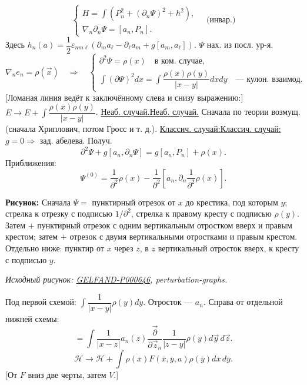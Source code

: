 \documentclass[11pt]{article}
\theoremstyle{definition}
\theoremstyle{remark}
\newcommand{\SourceFigure}[3]{%
  \par\begingroup\color{blue!60!black}\textbf{\hyperref[#1:source-page]{Source figure #1/#2}:} #3%
  \par\textit{Consult the authoritative scan at this locator.}\endgroup\par%
}
\renewcommand{\SourceFigure}[3]{%
  \par\begingroup\color{blue!55!black}\textbf{Рисунок:} #3%
  \par{\small\textit{Исходный рисунок: \hyperref[#1:source-page]{#1}, #2.}}%
  \endgroup\par%
}
\let\DiplomaticMathUnderline\underline
\renewcommand{\underline}[1]{\ifmmode\DiplomaticMathUnderline{#1}\else\uline{#1}\fi}
\begin{document}
\begin{equation*}
\begin{cases}
H=\int(P_n^2+(\partial_n\Psi)^2+h^2),\\
\nabla_n\partial_n\Psi=[a_n,P_n].
\end{cases}
\quad\text{(инвар.)}
\end{equation*}
Здесь $h_n(a)=\dfrac12\varepsilon_{nm\ell}(\partial_m a_\ell-\partial_\ell a_m+g[a_m,a_\ell])$.
$\Psi$ нах. из посл. ур-я.
\begin{equation*}
\nabla_n e_n=\rho(\vec x)\quad\Rightarrow\quad
\begin{cases}
\partial^2\Psi=\rho(x)\quad\text{в ком. случае},\\
\int(\partial\Psi)^2dx=\int\dfrac{\rho(x)\rho(y)}{|x-y|}dxdy\quad\text{--- кулон. взаимод.}
\end{cases}
\end{equation*}
[Ломаная линия ведёт к заключённому слева и снизу выражению:]
$E\to E+\int\dfrac{\rho(x)\rho(y)}{|x-y|}$.
\underline{Неаб. случай.} Сначала по теории возмущ. (сначала Хриплович, потом Гросс и т. д.).
\underline{Классич. случай:} $g=0\Rightarrow$ зад. абелева.
Получ.
\begin{equation*}
\partial^2\Psi+g[a_n,\partial_n\Psi]=g[a_n,P_n]+\rho(x).
\end{equation*}
Приближения:
\begin{equation*}
\Psi^{(0)}=\frac1{\partial^2}\rho(x)-\frac1{\partial^2}
\left[a_n,\partial_n\frac1{\partial^2}\rho(x)\right].
\end{equation*}
\SourceFigure{GELFAND-P000646}{perturbation-graphs}{Сначала $\Psi=$ пунктирный отрезок от $x$ до крестика, под которым $y$; стрелка к отрезку с подписью $1/\partial^2$, стрелка к правому кресту с подписью $\rho(y)$. Затем $+$ пунктирный отрезок с одним вертикальным отростком вверх и правым крестом; затем $+$ отрезок с двумя вертикальными отростками и правым крестом. Отдельно ниже: пунктир от $x$ через $z$, в $z$ вертикальный отросток вверх, к кресту с подписью $y$.}
Под первой схемой: $\int\dfrac1{|x-y|}\rho(y)dy$.
Отросток --- $a_n$.
Справа от отдельной нижней схемы:
\begin{equation*}
=\int\frac1{|x-z|}a_n(z)\frac{\vec\partial}{\partial\vec z_n}
\frac1{|z-y|}\rho(y)d\vec y\,d\vec z.
\end{equation*}
\begin{equation*}
\mathcal H\to\mathcal H+\int\rho(\bar x)F(\bar x,\bar y,a)\rho(\bar y)d\bar x\,d\bar y.
\end{equation*}
[От $F$ вниз две черты, затем $V$.]
\end{document}
